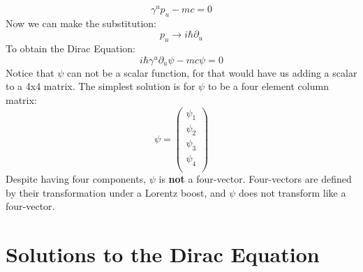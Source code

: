 \documentclass[12pt]{book}
\begin{document}
$$\gamma^u p_u - mc = 0$$
Now we can make the substitution:
$$p_u \to i \hbar \partial_u$$
To obtain the Dirac Equation:
\begin{equation}
\label{eqn:dirac}
i\hbar\gamma^u\partial_u \psi - mc \psi = 0
\end{equation}
Notice that $\psi$ can not be a scalar function, for that would have us adding a scalar to a 4x4 matrix.  The simplest solution is for $\psi$ to be a four element column matrix:
$$\psi = \begin{pmatrix} \psi_1 \\ \psi_2 \\ \psi_3 \\ \psi_4 \\ \end{pmatrix}$$
Despite having four components, $\psi$ is {\bf not} a four-vector.  Four-vectors are defined by their transformation under a Lorentz boost, and $\psi$ does not transform like a four-vector.

\section{Solutions to the Dirac Equation}
\end{document}
